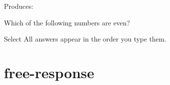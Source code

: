 \documentclass{ximera}
\begin{document}
Produces:

\begin{question}
  Which of the following numbers are even?
  \begin{selectAll}
  \end{selectAll}
\end{question}

\begin{remark}
  Select All answers appear in the order you type them. 
\end{remark}







\section{free-response}
\end{document}
